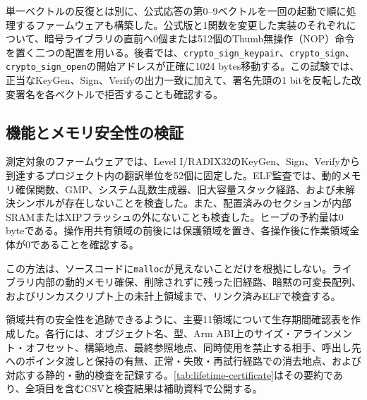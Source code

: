 \documentclass[a4paper,10pt]{ltjsarticle}
\theoremstyle{definition}
\theoremstyle{remark}
\begin{document}
単一ベクトルの反復とは別に、公式応答の第0--9ベクトルを一回の起動で順に処理するファームウェアも構築した。公式版と1関数を変更した実装のそれぞれについて、暗号ライブラリの直前へ0個または512個のThumb無操作（NOP）命令を置く二つの配置を用いる。後者では、\texttt{crypto\_sign\_keypair}、\texttt{crypto\_sign}、\texttt{crypto\_sign\_open}の開始アドレスが正確に\num{1024} bytes移動する。この試験では、正当なKeyGen、Sign、Verifyの出力一致に加えて、署名先頭の1 bitを反転した改変署名を各ベクトルで拒否することも確認する。

\subsection{機能とメモリ安全性の検証}

測定対象のファームウェアでは、Level I/RADIX32のKeyGen、Sign、Verifyから到達するプロジェクト内の翻訳単位を52個に固定した。ELF監査では、動的メモリ確保関数、GMP、システム乱数生成器、旧大容量スタック経路、および未解決シンボルが存在しないことを検査した。また、配置済みのセクションが内部SRAMまたはXIPフラッシュの外にないことも検査した。ヒープの予約量は0 byteである。操作用共有領域の前後には保護領域を置き、各操作後に作業領域全体が0であることを確認する。

この方法は、ソースコードに\texttt{malloc}が見えないことだけを根拠にしない。ライブラリ内部の動的メモリ確保、削除されずに残った旧経路、暗黙の可変長配列、およびリンカスクリプト上の未計上領域まで、リンク済みELFで検査する。

領域共有の安全性を追跡できるように、主要11領域について生存期間確認表を作成した。各行には、オブジェクト名、型、Arm ABI上のサイズ・アラインメント・オフセット、構築地点、最終参照地点、同時使用を禁止する相手、呼出し先へのポインタ渡しと保持の有無、正常・失敗・再試行経路での消去地点、および対応する静的・動的検査を記録する。\cref{tab:lifetime-certificate}はその要約であり、全項目を含むCSVと検査結果は補助資料で公開する。
\end{document}
